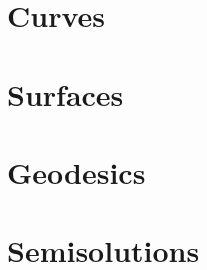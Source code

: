 \documentclass[twoside]{book}
\begin{document}







\part{Curves}






\part{Surfaces}


   

%
%

\part{Geodesics}


%

%





\part{Semisolutions}




\sloppy
\printbibliography[heading=bibintoc]
\fussy
\end{document}
